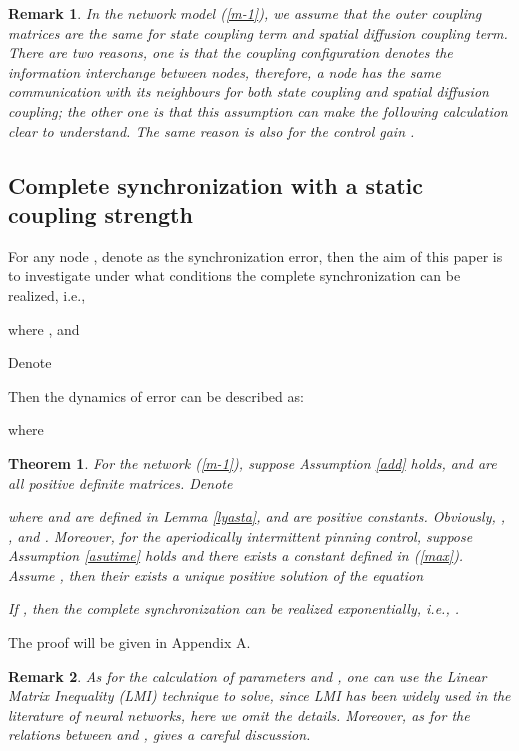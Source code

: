 \documentclass[review]{elsarticle}
\newtheorem{thm}{Theorem}
\newtheorem{rem}{Remark}
\begin{document}
\begin{rem}
In the network model (\ref{m-1}), we assume that the outer coupling matrices are the same for state coupling term and spatial diffusion coupling term. There are two reasons, one is that the coupling configuration denotes the information interchange between nodes, therefore, a node has the same communication with its neighbours for both state coupling and spatial diffusion coupling; the other one is that this assumption can make the following calculation clear to understand. The same reason is also for the control gain .
\end{rem}

\subsection{Complete synchronization with a static coupling strength}\label{static}
For any node , denote  as the synchronization error, then the aim of this paper is to investigate under what conditions the complete synchronization can be realized, i.e.,

where
, and


Denote

Then the dynamics of error  can be described as:

where


\begin{thm}\label{thm1}
For the network (\ref{m-1}), suppose Assumption \ref{add} holds,  and  are all positive definite matrices. Denote

where  and  are defined in Lemma \ref{lyasta},  and  are positive constants. Obviously, , , and . Moreover, for the aperiodically intermittent pinning control, suppose Assumption \ref{asutime} holds and there exists a constant  defined in (\ref{max}). Assume , then their exists a unique positive solution  of the equation

If , then the complete synchronization can be realized exponentially, i.e., .
\end{thm}
The proof will be given in Appendix A.

\begin{rem}\label{lmi}
As for the calculation of parameters  and , one can use the Linear Matrix Inequality (LMI) technique to solve, since LMI has been widely used in the literature of neural networks, here we omit the details. Moreover, as for the relations between  and , \cite{LL16} gives a careful discussion.
\end{rem}
\end{document}
